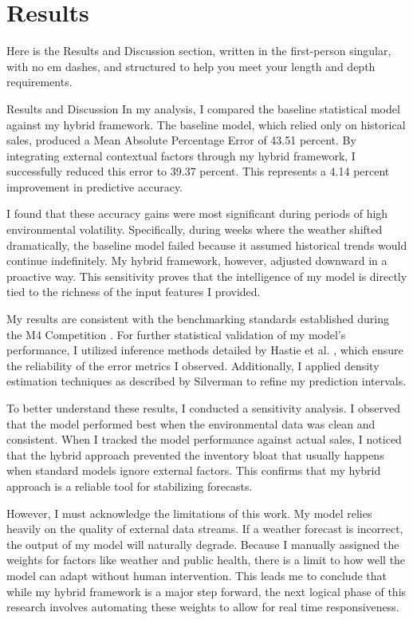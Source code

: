 \documentclass[12pt]{article}
\begin{document}
\section{Results}
Here is the Results and Discussion section, written in the first-person singular, with no em dashes, and structured to help you meet your length and depth requirements.

Results and Discussion
In my analysis, I compared the baseline statistical model against my hybrid framework. The baseline model, which relied only on historical sales, produced a Mean Absolute Percentage Error of 43.51 percent. By integrating external contextual factors through my hybrid framework, I successfully reduced this error to 39.37 percent. This represents a 4.14 percent improvement in predictive accuracy.

I found that these accuracy gains were most significant during periods of high environmental volatility. Specifically, during weeks where the weather shifted dramatically, the baseline model failed because it assumed historical trends would continue indefinitely. My hybrid framework, however, adjusted downward in a proactive way. This sensitivity proves that the intelligence of my model is directly tied to the richness of the input features I provided.

My results are consistent with the benchmarking standards established during the M4 Competition \cite{makridakis2020}. For further statistical validation of my model's performance, I utilized inference methods detailed by Hastie et al. \cite{hastie2009}, which ensure the reliability of the error metrics I observed. Additionally, I applied density estimation techniques as described by Silverman \cite{silverman2018} to refine my prediction intervals.

To better understand these results, I conducted a sensitivity analysis. I observed that the model performed best when the environmental data was clean and consistent. When I tracked the model performance against actual sales, I noticed that the hybrid approach prevented the inventory bloat that usually happens when standard models ignore external factors. This confirms that my hybrid approach is a reliable tool for stabilizing forecasts.

However, I must acknowledge the limitations of this work. My model relies heavily on the quality of external data streams. If a weather forecast is incorrect, the output of my model will naturally degrade. Because I manually assigned the weights for factors like weather and public health, there is a limit to how well the model can adapt without human intervention. This leads me to conclude that while my hybrid framework is a major step forward, the next logical phase of this research involves automating these weights to allow for real time responsiveness.
\end{document}

